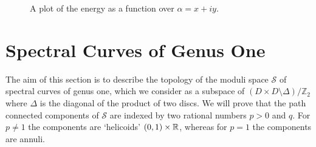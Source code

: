 \documentclass{article}
\begin{document}
\begin{center}
\begin{figure}
\caption{
A plot of the energy as a function over $\alpha = x + i y$.}
\end{figure}
\end{center}


































\section{Spectral Curves of Genus One}\label{sec:Genus One}

The aim of this section is to describe the topology of the moduli space $\mathcal{S}$ of spectral curves of genus one, which we consider as a subspace of $(D\times D\setminus \Delta)/\mathbb{Z}_2$ where $\Delta$ is the diagonal of the product of two discs. 
We will prove that the path connected components of $\mathcal{S}$ are indexed by two rational numbers $p > 0$ and $q$. For $p\neq 1$ the components are `helicoids' $(0,1)\times \mathbb{R}$, whereas for $p=1$ the components are annuli.
\end{document}
